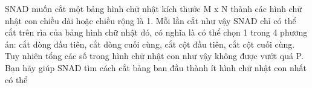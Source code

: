 SNAD muốn cắt một bảng hình chữ nhật kích thước M x N thành các hình chữ nhật con chiều dài hoặc chiều rộng là 1. Mỗi lần cắt như vậy SNAD chỉ có thể cắt trên rìa của bảng hình chữ nhật đó, có nghĩa là có thể chọn 1 trong 4 phương án: cắt dòng đầu tiên, cắt dòng cuối cùng, cắt cột đầu tiên, cắt cột cuối cùng. Tuy nhiên tổng các số trong hình chữ nhật con như vậy không được vướt quá P. Bạn hãy giúp SNAD tìm cách cắt bảng ban đầu thành ít hình chữ nhật con nhất có thể